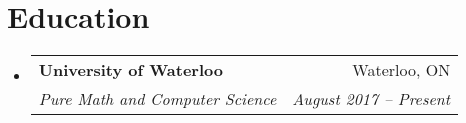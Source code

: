 \documentclass[letterpaper,11pt]{article}
\makeatletter
\newcommand{\resumeSubheading}[4]{
  \vspace{-1pt}\item
    \begin{tabular*}{0.97\textwidth}{l@{\extracolsep{\fill}}r}
      \textbf{#1} & #2 \\
      \textit{\small#3} & \textit{\small #4} \\
    \end{tabular*}\vspace{-5pt}
}
\newcommand{\resumeSubHeadingListStart}{\begin{itemize}[leftmargin=*, label={}]}
\newcommand{\resumeSubHeadingListEnd}{\end{itemize}}
\makeatother
\begin{document}

\section{Education}
  \resumeSubHeadingListStart
    \resumeSubheading
      {University of Waterloo}{Waterloo, ON}
      {Pure Math and Computer Science}{August 2017 -- Present}
  \resumeSubHeadingListEnd
\end{document}
